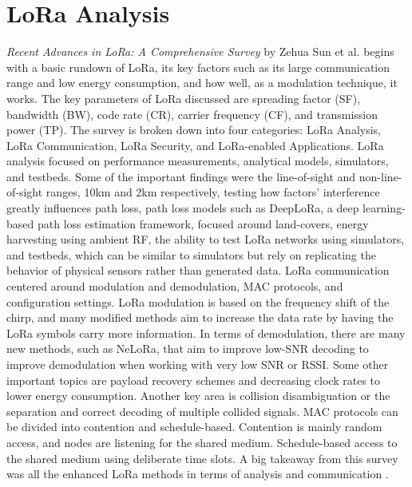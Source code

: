 \documentclass[sigsmall]{acmart}
\begin{document}
\section*{LoRa Analysis}
\textit{Recent Advances in LoRa: A Comprehensive Survey} by Zehua Sun et al. begins with a basic rundown of LoRa, its key factors such as its large communication range and low energy consumption, and how well, as a modulation technique, it works. The key parameters of LoRa discussed are spreading factor (SF), bandwidth (BW), code rate (CR), carrier frequency (CF), and transmission power (TP). The survey is broken down into four categories: LoRa Analysis, LoRa Communication, LoRa Security, and LoRa-enabled Applications.
LoRa analysis focused on performance measurements, analytical models, simulators, and testbeds. Some of the important findings were the line-of-sight and non-line-of-sight ranges, 10km and 2km respectively, testing how factors’ interference greatly influences path loss, path loss models such as DeepLoRa, a deep learning-based path loss estimation framework, focused around land-covers, energy harvesting using ambient RF, the ability to test LoRa networks using simulators, and testbeds, which can be similar to simulators but rely on replicating the behavior of physical sensors rather than generated data.
LoRa communication centered around modulation and demodulation, MAC protocols, and configuration settings. LoRa modulation is based on the frequency shift of the chirp, and many modified methods aim to increase the data rate by having the LoRa symbols carry more information. In terms of demodulation, there are many new methods, such as NeLoRa, that aim to improve low-SNR decoding to improve demodulation when working with very low SNR or RSSI. Some other important topics are payload recovery schemes and decreasing clock rates to lower energy consumption. Another key area is collision disambiguation or the separation and correct decoding of multiple collided signals. MAC protocols can be divided into contention and schedule-based. Contention is mainly random access, and nodes are listening for the shared medium. Schedule-based access to the shared medium using deliberate time slots. A big takeaway from this survey was all the enhanced LoRa methods in terms of analysis and communication \cite{sun2022recent}.
\end{document}
